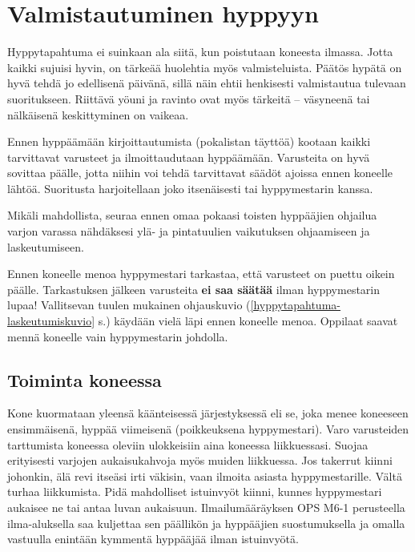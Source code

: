 \section{ Valmistautuminen hyppyyn }
\label{hyppytapahtuma-valmistautuminen-hyppyyn}


Hyppytapahtuma ei suinkaan ala siitä, kun poistutaan koneesta ilmassa. Jotta kaikki sujuisi hyvin, on tärkeää huolehtia myös valmisteluista. Päätös hypätä on hyvä tehdä jo edellisenä päivänä, sillä näin ehtii henkisesti valmistautua tulevaan suoritukseen. Riittävä yöuni ja ravinto ovat myös tärkeitä – väsyneenä tai nälkäisenä keskittyminen on vaikeaa. 


Ennen hyppäämään kirjoittautumista (pokalistan täyttöä) kootaan kaikki tarvittavat varusteet ja ilmoittaudutaan hyppäämään. Varusteita on hyvä sovittaa päälle, jotta niihin voi tehdä tarvittavat säädöt ajoissa ennen koneelle lähtöä. Suoritusta harjoitellaan joko itsenäisesti tai hyppymestarin kanssa. 


Mikäli mahdollista, seuraa ennen omaa pokaasi toisten hyppääjien ohjailua varjon varassa nähdäksesi ylä- ja pintatuulien vaikutuksen ohjaamiseen ja laskeutumiseen. 


Ennen koneelle menoa hyppymestari tarkastaa, että varusteet on puettu oikein päälle. Tarkastuksen jälkeen varusteita \textbf{ei saa säätää} ilman hyppymestarin lupaa! Vallitsevan tuulen mukainen ohjauskuvio (\ref{hyppytapahtuma-laskeutumiskuvio} s.\pageref{hyppytapahtuma-laskeutumiskuvio}) käydään vielä läpi ennen koneelle menoa. Oppilaat saavat mennä koneelle vain hyppymestarin johdolla. 

\subsection{ Toiminta koneessa }
\label{hyppytapahtuma-toiminta-koneessa}


Kone kuormataan yleensä käänteisessä järjestyksessä eli se, joka menee koneeseen ensimmäisenä, hyppää viimeisenä (poikkeuksena hyppymestari). Varo varusteiden tarttumista koneessa oleviin ulokkeisiin aina koneessa liikkuessasi. Suojaa erityisesti varjojen aukaisukahvoja myös muiden liikkuessa. Jos takerrut kiinni johonkin, älä revi itseäsi irti väkisin, vaan ilmoita asiasta hyppymestarille. Vältä turhaa liikkumista. Pidä mahdolliset istuinvyöt kiinni, kunnes hyppymestari aukaisee ne tai antaa luvan aukaisuun. Ilmailumääräyksen OPS M6-1 perusteella ilma-aluksella saa kuljettaa sen päällikön ja hyppääjien suostumuksella ja omalla vastuulla enintään kymmentä hyppääjää ilman istuinvyötä.  


